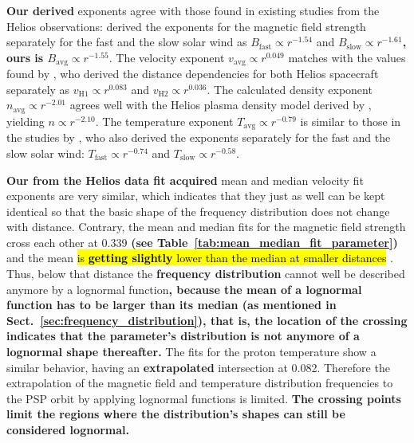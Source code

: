 \textbf{Our derived} exponents agree with those found in existing studies from the Helios observations: \citet{Mariani1978} derived the exponents for the magnetic field strength separately for the fast and the slow solar wind as $B_\text{fast} \propto r^{-1.54}$ and $B_\text{slow} \propto r^{-1.61}$\textbf{, ours is $B_\text{avg} \propto r^{-1.55}$}.
The velocity exponent \textbf{$v_\text{avg} \propto r^{0.049}$} matches with the values found by \citet{Schwenn1983,Schwenn1990}, who derived the distance dependencies for both Helios spacecraft separately as $v_\text{H1} \propto r^{0.083}$ and $v_\text{H2} \propto r^{0.036}$. The calculated density exponent \textbf{$n_\text{avg} \propto r^{-2.01}$} agrees well with the Helios plasma density model derived by \citet{Bougeret1984}, yielding $n \propto r^{-2.10}$.
The temperature exponent \textbf{$T_\text{avg} \propto r^{-0.79}$} is similar to those in the studies by \citet{Hellinger2011,Hellinger2013}, who also derived the exponents separately for the fast and the slow solar wind: $T_\text{fast} \propto r^{-0.74}$ and $T_\text{slow} \propto r^{-0.58}$.

\textbf{Our from the Helios data fit acquired} mean and median velocity fit exponents are very similar, which indicates that they just as well can be kept identical so that the basic shape of the frequency distribution does not change with distance. Contrary, the mean and median fits for the magnetic field strength cross each other at \SI{0.339}{\au} \textbf{(see Table~\ref{tab:mean_median_fit_parameter})} and the mean \hl{is \textbf{getting slightly} lower than the median at smaller distances }. Thus, below that distance the \textbf{frequency distribution} cannot well be described anymore by a lognormal function\textbf{, because the mean of a lognormal function has to be larger than its median (as mentioned in Sect.~\ref{sec:frequency_distribution}), that is, the location of the crossing indicates that the parameter's distribution is not anymore of a lognormal shape thereafter.} The fits for the proton temperature show a similar behavior, having an \textbf{extrapolated} intersection at \SI{0.082}{\au}. Therefore the extrapolation of the magnetic field and temperature distribution frequencies to the PSP orbit by applying lognormal functions is limited. \textbf{The crossing points limit the regions where the distribution's shapes can still be considered lognormal.}

